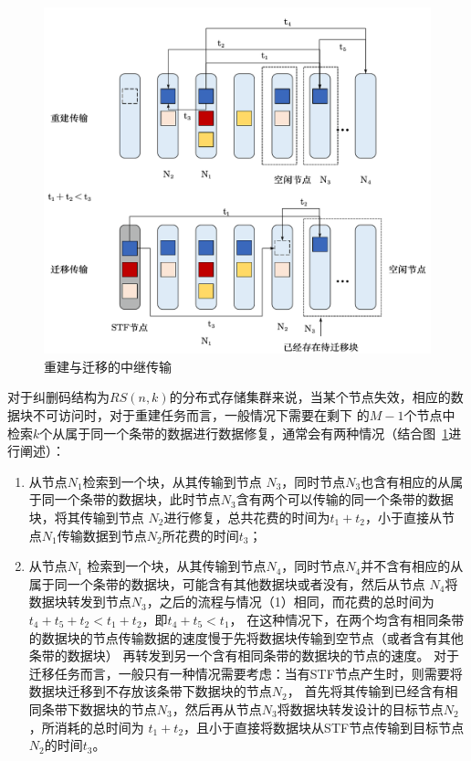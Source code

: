 \begin{figure}[htbp]
	\centering
	\includegraphics [scale=0.5]{figures/3.6.pdf}
	\caption{重建与迁移的中继传输}
	\label{fig:3.6}
\end{figure}

对于纠删码结构为$RS(n,k)$的分布式存储集群来说，当某个节点失效，相应的数据块不可访问时，对于重建任务而言，一般情况下需要在剩下
的$M-1$个节点中检索$k$个从属于同一个条带的数据进行数据修复，通常会有两种情况（结合图~\ref{fig:3.6}进行阐述）：

\begin{enumerate}
	\item 从节点$N_1$检索到一个块，从其传输到节点
	      $N_3$，同时节点$N_3$也含有相应的从属于同一个条带的数据块，此时节点$N_3$含有两个可以传输的同一个条带的数据块，将其传输到节点
	      $N_2$进行修复，总共花费的时间为$t_1+t_2$，小于直接从节点$N_1$传输数据到节点$N_2$所花费的时间$t_3$；
	\item 从节点$N_1$
	      检索到一个块，从其传输到节点$N_4$，同时节点$N_4$并不含有相应的从属于同一个条带的数据块，可能含有其他数据块或者没有，然后从节点
	      $N_4$将数据块转发到节点$N_3$，之后的流程与情况（1）相同，而花费的总时间为$t_4+t_5+t_2<t_1+t_2$，即$t_4+t_5<t_1$，
	      在这种情况下，在两个均含有相同条带的数据块的节点传输数据的速度慢于先将数据块传输到空节点（或者含有其他条带的数据块）
	      再转发到另一个含有相同条带的数据块的节点的速度。
	      对于迁移任务而言，一般只有一种情况需要考虑：当有STF节点产生时，则需要将数据块迁移到不存放该条带下数据块的节点$N_2$，
	      首先将其传输到已经含有相同条带下数据块的节点$N_3$，然后再从节点$N_3$将数据块转发设计的目标节点$N_2$，所消耗的总时间为
	      $t_1+t_2$，且小于直接将数据块从STF节点传输到目标节点$N_2$的时间$t_3$。
\end{enumerate}

